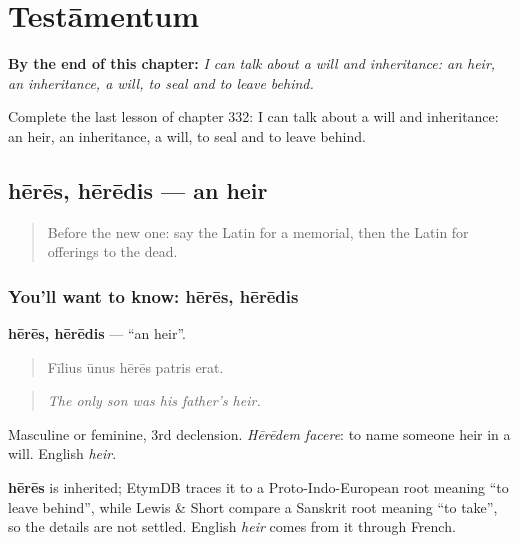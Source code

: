 
\chapter{Testāmentum}
\label{ch:la-testamentum}

\begin{chapteropening}
\textbf{By the end of this chapter:} \emph{I can talk about a will and inheritance: an heir, an inheritance, a will, to seal and to leave behind.}

Complete the last lesson of chapter 332: I can talk about a will and inheritance: an heir, an inheritance, a will, to seal and to leave behind.
\end{chapteropening}

\section[hērēs, hērēdis]{hērēs, hērēdis — an heir}

\label{lesson:LA-C332-heres}



\begin{quote}
Before the new one: say the Latin for a memorial, then the Latin for offerings to the dead.
\end{quote}

\subsection*{You'll want to know: hērēs, hērēdis}
\textbf{hērēs, hērēdis} — \textquotedblleft{}an heir\textquotedblright{}.

\begin{quote}
Fīlius ūnus hērēs patris erat.
\end{quote}

\begin{quote}
\emph{The only son was his father's heir.}
\end{quote}

Masculine or feminine, 3rd declension. \emph{Hērēdem facere}: to name someone heir in a will. English \emph{heir}.

\begin{cousinweb}
\textbf{hērēs} is inherited; EtymDB traces it to a Proto-Indo-European root meaning \textquotedblleft{}to leave behind\textquotedblright{}, while Lewis \& Short compare a Sanskrit root meaning \textquotedblleft{}to take\textquotedblright{}, so the details are not settled. English \emph{heir} comes from it through French.
\end{cousinweb}

